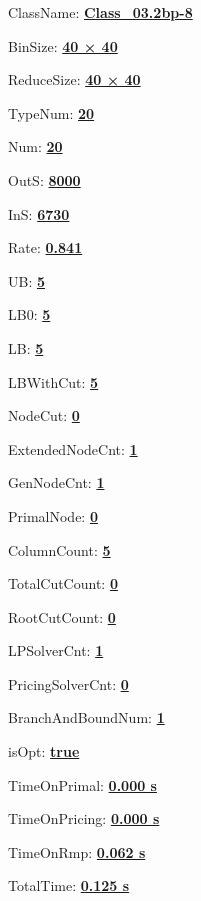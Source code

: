 \documentclass[11pt]{article}
\begin{document}
\pagestyle{empty}


ClassName: \underline{\textbf{Class_03.2bp-8}}
\par
BinSize: \underline{\textbf{40 × 40}}
\par
ReduceSize: \underline{\textbf{40 × 40}}
\par
TypeNum: \underline{\textbf{20}}
\par
Num: \underline{\textbf{20}}
\par
OutS: \underline{\textbf{8000}}
\par
InS: \underline{\textbf{6730}}
\par
Rate: \underline{\textbf{0.841}}
\par
UB: \underline{\textbf{5}}
\par
LB0: \underline{\textbf{5}}
\par
LB: \underline{\textbf{5}}
\par
LBWithCut: \underline{\textbf{5}}
\par
NodeCut: \underline{\textbf{0}}
\par
ExtendedNodeCnt: \underline{\textbf{1}}
\par
GenNodeCnt: \underline{\textbf{1}}
\par
PrimalNode: \underline{\textbf{0}}
\par
ColumnCount: \underline{\textbf{5}}
\par
TotalCutCount: \underline{\textbf{0}}
\par
RootCutCount: \underline{\textbf{0}}
\par
LPSolverCnt: \underline{\textbf{1}}
\par
PricingSolverCnt: \underline{\textbf{0}}
\par
BranchAndBoundNum: \underline{\textbf{1}}
\par
isOpt: \underline{\textbf{true}}
\par
TimeOnPrimal: \underline{\textbf{0.000 s}}
\par
TimeOnPricing: \underline{\textbf{0.000 s}}
\par
TimeOnRmp: \underline{\textbf{0.062 s}}
\par
TotalTime: \underline{\textbf{0.125 s}}
\par
\newpage


\end{document}
